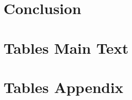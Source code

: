 \section{Conclusion}




\clearpage

\appendix

\section{Tables Main Text}


\clearpage


\clearpage


\clearpage


\section*{Tables Appendix}


\clearpage


\clearpage


\clearpage


\clearpage

